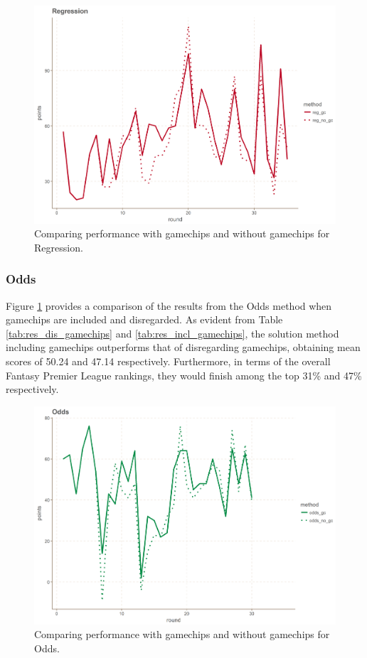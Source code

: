 \begin{figure}[H]
    \centering
    \includegraphics[scale=0.5]{fig/chapter_7/reg_gc_no_gc.png}
    \caption{Comparing performance with gamechips and without gamechips for Regression.}
\label{fig:reg_gc_no_gc}    
\end{figure}

\subsubsection{Odds}
Figure \ref{fig:reg_gc_no_gc} provides a comparison of the results from the Odds method when gamechips are included and disregarded. As evident from Table \ref{tab:res_dis_gamechips} and \ref{tab:res_incl_gamechips}, the solution method including gamechips outperforms that of disregarding gamechips, obtaining mean scores of 50.24 and 47.14 respectively. Furthermore, in terms of the overall Fantasy Premier League rankings, they would finish among the top 31\% and 47\% respectively. 

\begin{figure}[H]
    \centering
    \includegraphics[scale=0.5]{fig/chapter_7/odds_gc_no_gc.png}
    \caption{Comparing performance with gamechips and without gamechips for Odds.}
\label{fig:odds_gc_no_gc}    
\end{figure}

